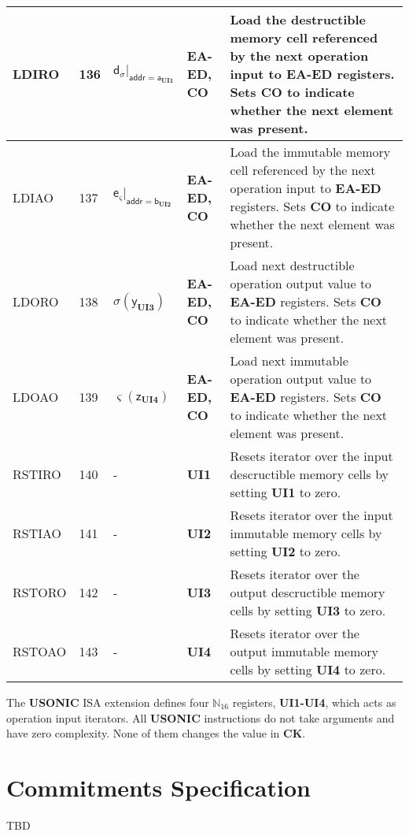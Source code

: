 \documentclass[9pt,oneside]{amsart}
\begin{document}
\begin{table}[h]
\begin{tabular}{l p{1cm} l p{1.5cm} p{9.3cm}}
LDIRO	&136	&$\mathsf{d}_\sigma|_{\mathsf{addr} = \mathsf{a}_\mathbf{UI1}}$	&\textbf{EA-ED, CO}	&Load the destructible memory cell referenced by the next operation input to \textbf{EA-ED} registers. Sets \textbf{CO} to indicate whether the next element was present. \\ \midrule
LDIAO	&137	&$\mathsf{e}_\varsigma|_{\mathsf{addr} = \mathsf{b}_\mathbf{UI2}}$	&\textbf{EA-ED, CO}	&Load the immutable memory cell referenced by the next operation input to \textbf{EA-ED} registers. Sets \textbf{CO} to indicate whether the next element was present. \\ \midrule
LDORO	&138	&$\sigma(\mathsf{y}_\mathbf{UI3})$	&\textbf{EA-ED, CO}	&Load next destructible operation output value to \textbf{EA-ED} registers. Sets \textbf{CO} to indicate whether the next element was present. \\ \midrule
LDOAO	&139	&$\varsigma(\mathsf{z}_\mathbf{UI4})$	&\textbf{EA-ED, CO}	&Load next immutable operation output value to \textbf{EA-ED} registers. Sets \textbf{CO} to indicate whether the next element was present. \\ \midrule
RSTIRO	&140	&-	&\textbf{UI1}	&Resets iterator over the input descructible memory cells by setting \textbf{UI1} to zero. \\ \midrule
RSTIAO	&141	&-	&\textbf{UI2}	&Resets iterator over the input immutable memory cells by setting \textbf{UI2} to zero. \\ \midrule
RSTORO	&142	&-	&\textbf{UI3}	&Resets iterator over the output descructible memory cells by setting \textbf{UI3} to zero. \\ \midrule
RSTOAO	&143	&-	&\textbf{UI4}	&Resets iterator over the output immutable memory cells by setting \textbf{UI4} to zero. \\
\bottomrule
\end{tabular}
\end{table}

The \textbf{USONIC} ISA extension defines four $\mathbb{N}_{16}$ registers, \textbf{UI1-UI4}, which acts as operation input iterators.
All \textbf{USONIC} instructions do not take arguments and have zero complexity. None of them changes the value in \textbf{CK}.


\newpage
\section{Commitments Specification}\label{AnnexB}

TBD
\end{document}
